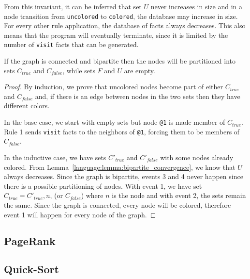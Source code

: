 From this invariant, it can be inferred that set $U$ never increases in size
and in a node transition from \texttt{uncolored} to \texttt{colored}, the
database may increase in size. For every other rule application, the database of
facts always decreases. This also means that the program will eventually
terminate, since it is limited by the number of \texttt{visit} facts that can be
generated.

\begin{theorem}
If the graph is connected and bipartite then the nodes will be partitioned into
sets $C_{true}$ and $C_{false}$, while sets $F$ and $U$ are empty.
\end{theorem}
\begin{proof}
   By induction, we prove that uncolored nodes become part of either $C_{true}$
   and $C_{false}$ and, if there is an edge between nodes in the two sets then
   they have different colors.

   In the base case, we start with empty sets but node \texttt{@1} is made
   member of $C_{true}$. Rule 1 sends \texttt{visit} facts to the neighbors of
   \texttt{@1}, forcing them to be members of $C_{false}$.

   In the inductive case, we have sets $C'_{true}$ and $C'_{false}$ with some
   nodes already colored. From Lemma~\ref{language:lemma:bipartite_convergence},
   we know that $U$ always decreases. Since the graph is bipartite, events 3 and
   4 never happen since there is a possible partitioning of nodes. With event 1,
   we have set $C_{true} = C'_{true}, n$, (or $C_{false}$) where $n$ is the
   node and with event 2, the sets remain the same. Since the graph is
   connected, every node will be colored, therefore event 1 will happen for
   every node of the graph.
\end{proof}

\subsection{PageRank}

\subsection{Quick-Sort}

